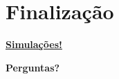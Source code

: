 \section{Finalização}
\begin{frame}
    \begin{center}
        \VERYHuge {}\href{https://drive.google.com/drive/folders/1-hTkoiyW0hnV3w0Sve7lduudnBG_6FTv?usp=sharing}{\textbf{Simulações!}}
    \end{center}
\end{frame}

\begin{frame}
    \begin{center}
        \VERYHuge {}\textbf{Perguntas?}
    \end{center}
\end{frame}